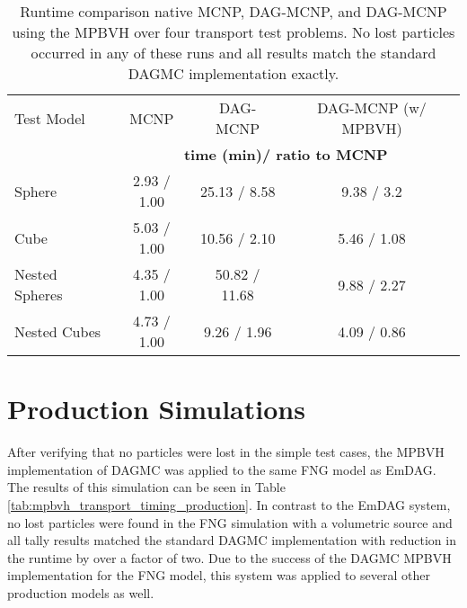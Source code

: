 \begin{table}[H]
  \small
  \begin{center}
    \begin{tabular}{lccc}

      \toprule
      Test Model & MCNP & DAG-MCNP & DAG-MCNP (w/ MPBVH) \\
      & \multicolumn{3}{c}{\textbf{time (min)/ ratio to MCNP}} \\
      \hline
      Sphere         & 2.93 / 1.00 & 25.13 / 8.58  & 9.38 / 3.2  \\
      Cube           & 5.03 / 1.00 & 10.56 / 2.10 & 5.46 / 1.08 \\
      Nested Spheres & 4.35 / 1.00  & 50.82 / 11.68  & 9.88 / 2.27 \\
      Nested Cubes   & 4.73 / 1.00 & 9.26 / 1.96 & 4.09 / 0.86 \\
      \bottomrule
    \end{tabular}
  \end{center}
  \caption{Runtime comparison native MCNP, DAG-MCNP, and DAG-MCNP using the
    MPBVH over four transport test problems. No lost particles occurred in any of
  these runs and all results match the standard DAGMC implementation exactly.}
  \label{tab:mpbvh_transport_timing_simple}
\end{table}

\section{Production Simulations}\label{subsec:mpbvh_production_transport}

After verifying that no particles were lost in the simple test cases, the MPBVH
implementation of DAGMC was applied to the same FNG model as EmDAG. The results
of this simulation can be seen in Table
\ref{tab:mpbvh_transport_timing_production}. In contrast to the EmDAG system, no
lost particles were found in the FNG simulation with a volumetric source and all
tally results matched the standard DAGMC implementation with reduction in the
runtime by over a factor of two. Due to the success of the DAGMC MPBVH
implementation for the FNG model, this system was applied to several other
production models as well.

